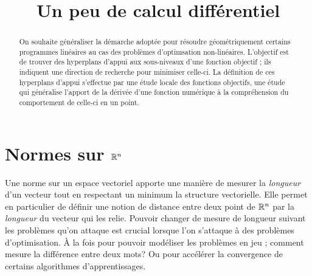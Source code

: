 \documentclass[11pt, a4paper]{article}
\title{%
  { \huge Un peu de calcul différentiel}%
}
\author{}
\date{}
\begin{document}
\maketitle\thispagestyle{fancy}

\begin{abstract}
  On souhaite généraliser la démarche adoptée pour résoudre
  géométriquement certains programmes linéaires au cas des problèmes
  d'optimsation non-linéaires. L'objectif est de trouver des
  hyperplans d'appui aux sous-niveaux d'une fonction objectif ; ils
  indiquent une direction de recherche pour minimiser celle-ci. La
  définition de ces hyperplans d'appui s'effectue par une étude locale
  des fonctions objectifs, une étude qui généralise l'apport de la
  dérivée d'une fonction numérique à la compréhension du comportement
  de celle-ci en un point.
\end{abstract}

\tableofcontents

\section{Normes sur $\mathbb{R}^n$}
\label{sec:nomesRn}

Une norme sur un espace vectoriel apporte une manière de mesurer la
\textit{longueur} d'un vecteur tout en respectant un minimum la
structure vectorielle. Elle permet en particulier de définir une
notion de distance entre deux point de $\mathbb{R}^n$ par la \textit{longueur}
du vecteur qui les relie. Pouvoir changer de mesure de longueur
suivant les problèmes qu'on attaque est crucial lorsque l'on s'attaque
à des problèmes d'optimisation. À la fois pour pouvoir modéliser les
problèmes en jeu ; comment mesure la différence entre deux mots? Ou
pour accélérer la convergence de certains algorithmes
d'apprentissages.
\end{document}
